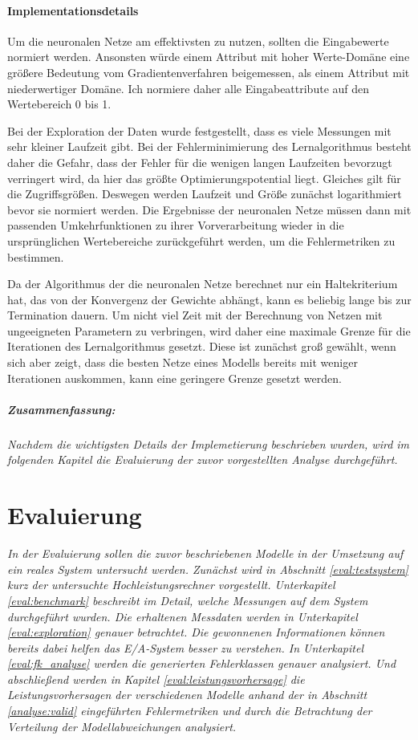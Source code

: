 \documentclass[
	12pt,
	a4paper,
	BCOR10mm,
	DIV14,
	listof=totoc,
	bibliography=totoc,
	headsepline
]{scrreprt}
\begin{document}
\subsubsection{Implementationsdetails}
Um die neuronalen Netze am effektivsten zu nutzen, sollten die Eingabewerte normiert werden. Ansonsten würde einem Attribut mit hoher Werte-Domäne eine größere Bedeutung vom Gradientenverfahren beigemessen, als einem Attribut mit niederwertiger Domäne. 
Ich normiere daher alle Eingabeattribute auf den Wertebereich 0 bis 1.\medskip

Bei der Exploration der Daten wurde festgestellt, dass es viele Messungen mit sehr kleiner Laufzeit gibt.
Bei der Fehlerminimierung des Lernalgorithmus besteht daher die Gefahr, dass der Fehler für die wenigen langen Laufzeiten bevorzugt verringert wird, da hier das größte Optimierungspotential liegt. Gleiches gilt für die Zugriffsgrößen.
Deswegen werden Laufzeit und Größe zunächst logarithmiert bevor sie normiert werden.
Die Ergebnisse der neuronalen Netze müssen dann mit passenden Umkehrfunktionen zu ihrer Vorverarbeitung wieder in die ursprünglichen Wertebereiche zurückgeführt werden, um die Fehlermetriken zu bestimmen.\medskip

Da der Algorithmus der die neuronalen Netze berechnet nur ein Haltekriterium hat, das von der Konvergenz der Gewichte abhängt, kann es beliebig lange bis zur Termination dauern.
Um nicht viel Zeit mit der Berechnung von Netzen mit ungeeigneten Parametern zu verbringen, wird daher eine maximale Grenze für die Iterationen des Lernalgorithmus gesetzt. Diese ist zunächst groß gewählt, wenn sich aber zeigt, dass die besten Netze eines Modells bereits mit weniger Iterationen auskommen, kann eine geringere Grenze gesetzt werden.

\paragraph{Zusammenfassung:}
\textit{
	Nachdem die wichtigsten Details der Implemetierung beschrieben wurden, wird im folgenden Kapitel die Evaluierung der zuvor vorgestellten Analyse durchgeführt.
}

\chapter{Evaluierung}
\label{eval}
\textit{%
	In der Evaluierung sollen die zuvor beschriebenen Modelle in der Umsetzung auf ein reales System untersucht werden.
	Zunächst wird in Abschnitt \ref{eval:testsystem} kurz der untersuchte Hochleistungsrechner vorgestellt.	
	Unterkapitel \ref{eval:benchmark} beschreibt im Detail, welche Messungen auf dem System durchgeführt wurden.
	Die erhaltenen Messdaten werden in Unterkapitel \ref{eval:exploration} genauer betrachtet. Die gewonnenen Informationen können bereits dabei helfen das E/A-System besser zu verstehen.
	In Unterkapitel \ref{eval:fk_analyse} werden die generierten Fehlerklassen genauer analysiert.
	Und abschließend werden in Kapitel \ref{eval:leistungsvorhersage} die Leistungsvorhersagen der verschiedenen Modelle anhand der in Abschnitt \ref{analyse:valid} eingeführten Fehlermetriken und durch die Betrachtung der Verteilung der Modellabweichungen analysiert.
}
\bigskip
\end{document}
